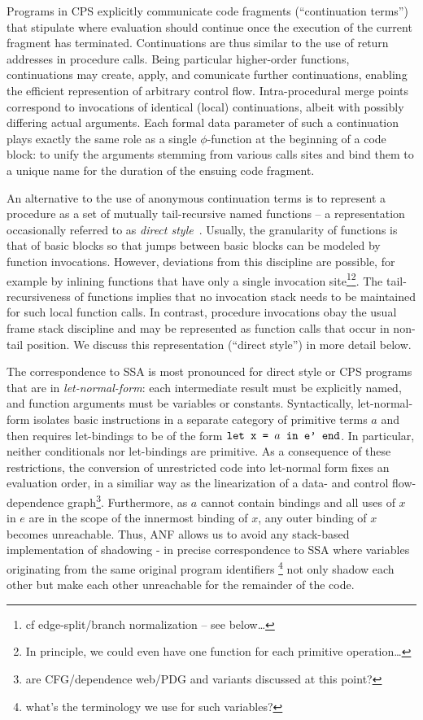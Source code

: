Programs in CPS explicitly communicate code fragments (``continuation
terms'') that stipulate where evaluation should continue once the
execution of the current fragment has terminated. Continuations are
thus similar to the use of return addresses in procedure calls. Being
particular higher-order functions, continuations may create, apply,
and comunicate further continuations, enabling the efficient
represention of arbitrary control flow.  Intra-procedural 
merge points correspond to invocations of identical (local)
continuations, albeit with possibly differing actual arguments.
Each formal data parameter of such a continuation plays exactly the
same role as a single $\phi$-function at the beginning of a code
block: to unify the arguments stemming from various calls sites and
bind them to a unique name for the duration of the ensuing code
fragment.

An alternative to the use of anonymous continuation terms is to
represent a procedure as a set of mutually tail-recursive named
functions -- a representation occasionally referred to as \emph{direct
style}~\cite{Reynolds1974}. Usually, the granularity of functions is
that of basic blocks so that jumps between basic blocks can be modeled
by function invocations. However, deviations from this discipline are
possible, for example by inlining functions that have only a single
invocation site\footnote{cf edge-split/branch normalization -- see
below\ldots}\footnote{In principle, we could even have one function
for each primitive operation\ldots}.  The tail-recursiveness of
functions implies that no invocation stack needs to be maintained for
such local function calls. In contrast, procedure invocations obay the
usual frame stack discipline and may be represented as function calls
that occur in non-tail position.  We discuss this representation
(``direct style'') in more detail below.

The correspondence to SSA is most pronounced for direct style or CPS
programs that are in \emph{let-normal-form}: each intermediate result
must be explicitly named, and function arguments must be variables or
constants. Syntactically, let-normal-form isolates basic instructions
in a separate category of primitive terms $a$ and then requires
let-bindings to be of the form $\verb|let x = | a \verb| in e' end|$.
In particular, neither conditionals nor let-bindings are primitive. As
a consequence of these restrictions, the conversion of unrestricted
code into let-normal form fixes an evaluation order, in a
similiar way as the linearization of a data- and control
flow-dependence graph\footnote{are CFG/dependence web/PDG and variants
discussed at this point?}.  Furthermore, as $a$ cannot contain bindings
and all uses of $x$ in $e$ are in the scope of the innermost binding
of $x$, any outer binding of $x$ becomes unreachable. Thus, ANF allows
us to avoid any stack-based implementation of shadowing - in precise
correspondence to SSA where variables originating from the same
original program identifiers \footnote{what's the terminology we use
for such variables?} not only shadow each other but make each other
unreachable for the remainder of the code.

